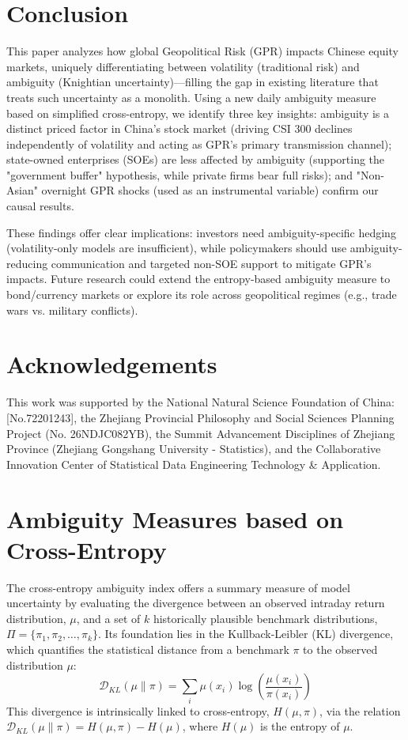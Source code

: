 \documentclass[preprint,12pt,authoryear]{elsarticle}
\begin{document}
\section{Conclusion}
\label{sec:conclusion}

This paper analyzes how global Geopolitical Risk (GPR) impacts Chinese equity markets, uniquely differentiating between volatility (traditional risk) and ambiguity (Knightian uncertainty)—filling the gap in existing literature that treats such uncertainty as a monolith. Using a new daily ambiguity measure based on simplified cross-entropy, we identify three key insights: ambiguity is a distinct priced factor in China’s stock market (driving CSI 300 declines independently of volatility and acting as GPR’s primary transmission channel); state-owned enterprises (SOEs) are less affected by ambiguity (supporting the "government buffer" hypothesis, while private firms bear full risks); and "Non-Asian" overnight GPR shocks (used as an instrumental variable) confirm our causal results.

These findings offer clear implications: investors need ambiguity-specific hedging (volatility-only models are insufficient), while policymakers should use ambiguity-reducing communication and targeted non-SOE support to mitigate GPR’s impacts. Future research could extend the entropy-based ambiguity measure to bond/currency markets or explore its role across geopolitical regimes (e.g., trade wars vs. military conflicts).




\clearpage
\section*{Acknowledgements}
This work was supported by the National Natural Science Foundation of China:[No.72201243], the Zhejiang Provincial Philosophy and Social Sciences Planning Project (No. 26NDJC082YB), the Summit Advancement Disciplines of Zhejiang Province (Zhejiang Gongshang University - Statistics), and the Collaborative Innovation Center of Statistical Data Engineering Technology \& Application.

\appendix

\section{Ambiguity Measures based on Cross-Entropy}
The cross-entropy ambiguity index offers a summary measure of model uncertainty by evaluating the divergence between an observed intraday return distribution, $\mu$, and a set of $k$ historically plausible benchmark distributions, $\Pi = \{\pi_1, \pi_2, \dots, \pi_k\}$. Its foundation lies in the Kullback-Leibler (KL) divergence, which quantifies the statistical distance from a benchmark $\pi$ to the observed distribution $\mu$:
\begin{equation}
    \mathcal{D}_{KL}(\mu \| \pi) = \sum_{i} \mu(x_i) \log\left(\frac{\mu(x_i)}{\pi(x_i)}\right)
\end{equation}
This divergence is intrinsically linked to cross-entropy, $H(\mu, \pi)$, via the relation $\mathcal{D}_{KL}(\mu \| \pi) = H(\mu, \pi) - H(\mu)$, where $H(\mu)$ is the entropy of $\mu$.
\end{document}
